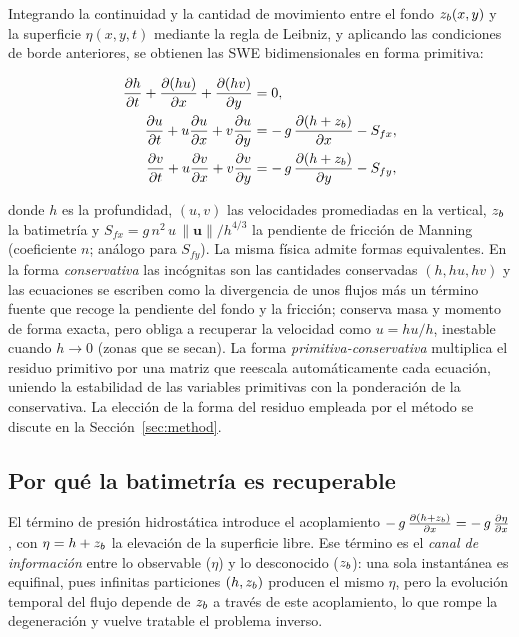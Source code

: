 Integrando la continuidad y la cantidad de movimiento entre el fondo
$z_b(x,y)$ y la superficie $\eta(x,y,t)$ mediante la regla de Leibniz, y
aplicando las condiciones de borde anteriores, se obtienen las SWE
bidimensionales en forma primitiva:

\begin{align}
  \frac{\partial h}{\partial t} + \frac{\partial (hu)}{\partial x} + \frac{\partial (hv)}{\partial y} &= 0,
    \label{eq:swe-cont}\\
  \frac{\partial u}{\partial t} + u\frac{\partial u}{\partial x} + v\frac{\partial u}{\partial y} &= -\,g\,\frac{\partial (h+z_b)}{\partial x} - S_{fx},
    \label{eq:swe-momx}\\
  \frac{\partial v}{\partial t} + u\frac{\partial v}{\partial x} + v\frac{\partial v}{\partial y} &= -\,g\,\frac{\partial (h+z_b)}{\partial y} - S_{fy},
    \label{eq:swe-momy}
\end{align}

donde $h$ es la profundidad, $(u,v)$ las velocidades promediadas en la
vertical, $z_b$ la batimetría y $S_{fx} = g\,n^2\,u\,\lVert\mathbf{u}\rVert /
h^{4/3}$ la pendiente de fricción de Manning (coeficiente $n$; análogo para
$S_{fy}$). La misma física admite formas equivalentes. En la forma
\emph{conservativa} las incógnitas son las cantidades conservadas
$(h, hu, hv)$ y las ecuaciones se escriben como la divergencia de unos flujos
más un término fuente que recoge la pendiente del fondo y la fricción; conserva
masa y momento de forma exacta, pero obliga a recuperar la velocidad como
$u = hu/h$, inestable cuando $h \to 0$ (zonas que se secan). La forma
\emph{primitiva-conservativa} multiplica el residuo primitivo por una matriz
que reescala automáticamente cada ecuación, uniendo la estabilidad de las
variables primitivas con la ponderación de la conservativa. La elección de la
forma del residuo empleada por el método se discute en la
Sección~\ref{sec:method}.

\subsection{Por qué la batimetría es recuperable}

El término de presión hidrostática introduce el acoplamiento
$-\,g\,\frac{\partial (h+z_b)}{\partial x} = -\,g\,\frac{\partial \eta}{\partial x}$, con $\eta = h + z_b$ la
elevación de la superficie libre. Ese término es el \emph{canal de información}
entre lo observable ($\eta$) y lo desconocido ($z_b$): una sola instantánea es
equifinal, pues infinitas particiones $(h,z_b)$ producen el mismo $\eta$, pero
la evolución temporal del flujo depende de $z_b$ a través de este acoplamiento,
lo que rompe la degeneración y vuelve tratable el problema inverso.

